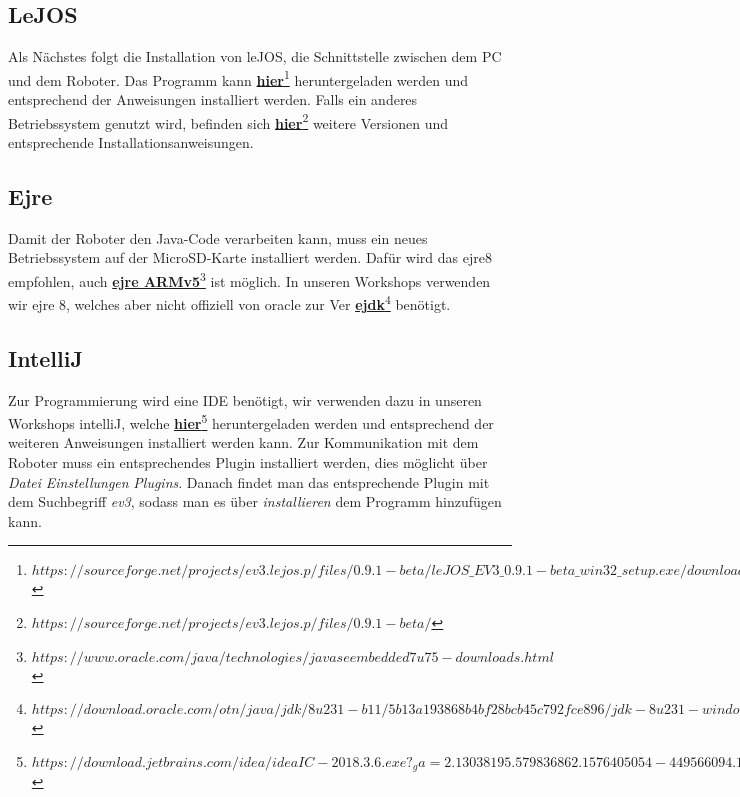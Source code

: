 \documentclass[
	ngerman,
	accentcolor=1c,%
	]{tudapub}
\begin{document}
\subsection{LeJOS}
Als N\"achstes folgt die Installation von leJOS, die Schnittstelle zwischen dem PC und dem Roboter. Das Programm kann
\href{https://sourceforge.net/projects/ev3.lejos.p/files/0.9.1-beta/leJOS\_EV3\_0.9.1-beta\_win32\_setup.exe/download}{\textbf{hier}\footnote{$https://sourceforge.net/projects/ev3.lejos.p/files/0.9.1-beta/leJOS\_EV3\_0.9.1-beta\_win32\_setup.exe/download$}}
heruntergeladen werden und entsprechend der Anweisungen installiert werden.\newline
Falls ein anderes Betriebssystem genutzt wird, befinden sich
\href{https://sourceforge.net/projects/ev3.lejos.p/files/0.9.1-beta/}{\textbf{hier}\footnote{$https://sourceforge.net/projects/ev3.lejos.p/files/0.9.1-beta/$}} weitere Versionen und entsprechende Installationsanweisungen.

\subsection{Ejre}
Damit der Roboter den Java-Code verarbeiten kann, muss ein neues Betriebssystem auf der MicroSD-Karte installiert werden. Daf\"ur wird das ejre8 empfohlen, auch
\href{https://www.oracle.com/java/technologies/javaseembedded7u75-downloads.html}{\textbf{ejre ARMv5}\footnote{$https://www.oracle.com/java/technologies/javaseembedded7u75-downloads.html$}}
ist m\"oglich. In unseren Workshops verwenden wir ejre 8, welches aber nicht offiziell von oracle zur Ver
\href{https://download.oracle.com/otn/java/jdk/8u231-b11/5b13a193868b4bf28bcb45c792fce896/jdk-8u231-windows-i586.exe}{\textbf{ejdk}\footnote{$https://download.oracle.com/otn/java/jdk/8u231-b11/5b13a193868b4bf28bcb45c792fce896/jdk-8u231-windows-i586.exe$}} ben\"otigt.

\subsection{IntelliJ}
Zur Programmierung wird eine IDE ben\"otigt, wir verwenden dazu in unseren Workshops intelliJ, welche 
\href{https://download.jetbrains.com/idea/ideaIC-2018.3.6.exe?_ga=2.13038195.579836862.1576405054-449566094.1572879017}{\textbf{hier}\footnote{$https://download.jetbrains.com/idea/ideaIC-2018.3.6.exe?_ga=2.13038195.579836862.1576405054-449566094.1572879017$}}
heruntergeladen werden und entsprechend der weiteren Anweisungen installiert werden kann. Zur Kommunikation mit dem Roboter muss ein entsprechendes Plugin installiert werden, dies möglicht über \textit{Datei} \rightarrow{} \textit{Einstellungen} \rightarrow{} \textit{Plugins}. Danach findet man das entsprechende Plugin mit dem Suchbegriff \textit{ev3}, sodass man es \"uber \textit{installieren} dem Programm hinzuf\"ugen kann.
\end{document}
